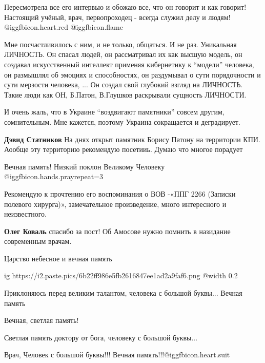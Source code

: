 \begin{itemize}

Пересмотрела все его интервью и обожаю все, что он говорит и как говорит!
Настоящий учёный, врач, первопроходец - всегда служил делу и людям!
@igg{fbicon.heart.red} @igg{fbicon.flame} 


Мне посчастливилось с ним, и не только, общаться. И не раз. Уникальная
ЛИЧНОСТЬ. Он спасал людей, он рассматривал их как высшую модель, он создавал
искусственный интеллект применяя кибернетику к \enquote{модели} человека, он размышлял
об эмоциях и способностях, он раздумывал о сути порядочности и сути мерзости
человека, ... Он создал свой глубокий взгляд на ЛИЧНОСТЬ. Такие люди как ОН,
Б.Патон, В.Глушков раскрывали сущность ЛИЧНОСТИ.

И очень жаль, что в Украине \enquote{воздвигают памятники} совсем другим, сомнительным.
Мне кажется, поэтому Украина сокращается и деградирует.

\begin{itemize} %
\textbf{Дэвид Статников} На днях открыт памятник Борису Патону на территории КПИ. Аообще эту территорию рекомендую посетииь. Думаю что многое порадует
\end{itemize} %

Вечная память! Низкий поклон Великому Человеку @igg{fbicon.hands.pray}{repeat=3} 


Рекомендую к прочтению его воспоминания о ВОВ -«ППГ 2266 (Записки полевого
хирурга)», замечательное произведение, много интересного и неизвестного.


\textbf{Олег Коваль} спасибо за пост! Об Амосове нужно помнить в назидание современным врачам.

Царство небесное и вечная память


\ifcmt
  ig https://i2.paste.pics/6b22ff986e5fb2616847ee1ad2a9faf6.png
  @width 0.2
\fi

Приклоняюсь перед великим талантом, человека с большой буквы... Вечная память

Вечная, светлая память!

Светлая память доктору от бога, человеку с большой буквы...

Врач, Человек с большой буквы!!! Вечная память!!!@igg{fbicon.heart.suit}


\end{itemize}
